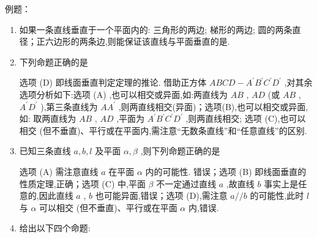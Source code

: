 例题：
\begin{enumerate}
    \item 如果一条直线垂直于一个平面内的: 三角形的两边; 梯形的两边; 圆的两条直径；正六边形的两条边,则能保证该直线与平面垂直的是.
    \item 下列命题正确的是
    \begin{jieda}
        选项 (D) 即线面垂直判定定理的推论. 借助正方体 ${ABCD} - {A}^{\prime }{B}^{\prime }{C}^{\prime }{D}^{\prime }$ ,对其余选项分析如下:选项 (A) ,也可以相交或异面,如:两直线为 ${AB}$ , ${AD}$ (或 ${AB}$ , ${A}^{\prime }{D}^{\prime }$ ),第三条直线为 $A{A}^{\prime }$ ,则两直线相交(异面)；选项(B),也可以相交或异面,如: 取两直线为 ${AB}$ , ${AD}$ ,平面为 ${A}^{\prime }{B}^{\prime }{C}^{\prime }{D}^{\prime }$ ,则两直线相交; 选项 (C),也可以相交 (但不垂直)、平行或在平面内,需注意“无数条直线”和“任意直线”的区别.
    \end{jieda}
    \item 已知三条直线 $a,b,l$ 及平面 $\alpha ,\beta$ ,则下列命题正确的是 
    \begin{jieda}
        选项 (A) 需注意直线 $a$ 在平面 $\alpha$ 内的可能性. 错误；选项 (B) 即线面垂直的性质定理,正确；选项 (C) 中,平面 $\beta$ 不一定通过直线 $a$ ,故直线 $b$ 事实上是任意的,因此直线 $a$ , $b$ 也可能异面,错误；选项 (D),需注意 $a//b$ 的可能性,此时 $l$ 与 $\alpha$ 可以相交 (但不垂直)、平行或在平面 $\alpha$ 内,错误.
    \end{jieda}
    \item 给出以下四个命题:
    

\end{enumerate}
